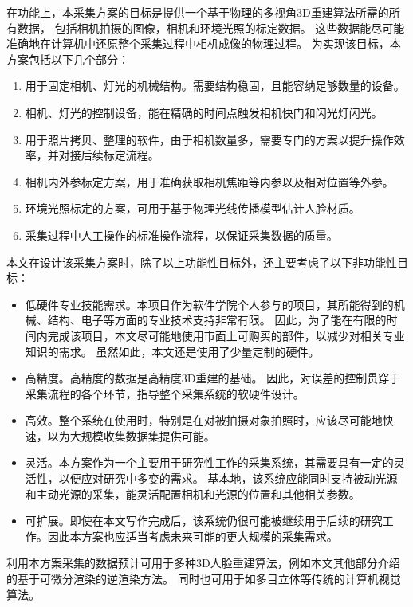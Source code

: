 在功能上，本采集方案的目标是提供一个基于物理的多视角3D重建算法所需的所有数据，
包括相机拍摄的图像，相机和环境光照的标定数据。
这些数据能尽可能准确地在计算机中还原整个采集过程中相机成像的物理过程。
为实现该目标，本方案包括以下几个部分：
\begin{enumerate}
\item 用于固定相机、灯光的机械结构。需要结构稳固，且能容纳足够数量的设备。
\item 相机、灯光的控制设备，能在精确的时间点触发相机快门和闪光灯闪光。
\item 用于照片拷贝、整理的软件，由于相机数量多，需要专门的方案以提升操作效率，并对接后续标定流程。
\item 相机内外参标定方案，用于准确获取相机焦距等内参以及相对位置等外参。
\item 环境光照标定的方案，可用于基于物理光线传播模型估计人脸材质。
\item 采集过程中人工操作的标准操作流程，以保证采集数据的质量。
\end{enumerate}
本文在设计该采集方案时，除了以上功能性目标外，还主要考虑了以下非功能性目标：
\begin{itemize}
\item 低硬件专业技能需求。本项目作为软件学院个人参与的项目，其所能得到的机械、结构、电子等方面的专业技术支持非常有限。
因此，为了能在有限的时间内完成该项目，本文尽可能地使用市面上可购买的部件，以减少对相关专业知识的需求。
虽然如此，本文还是使用了少量定制的硬件。

\item 高精度。高精度的数据是高精度3D重建的基础。
因此，对误差的控制贯穿于采集流程的各个环节，指导整个采集系统的软硬件设计。

\item 高效。整个系统在使用时，特别是在对被拍摄对象拍照时，应该尽可能地快速，以为大规模收集数据集提供可能。

\item 灵活。本方案作为一个主要用于研究性工作的采集系统，其需要具有一定的灵活性，以便应对研究中多变的需求。
基本地，该系统应能同时支持被动光源和主动光源的采集，能灵活配置相机和光源的位置和其他相关参数。

\item 可扩展。即使在本文写作完成后，该系统仍很可能被继续用于后续的研究工作。因此本方案也应适当考虑未来可能的更大规模的采集需求。

\end{itemize}

利用本方案采集的数据预计可用于多种3D人脸重建算法，例如本文其他部分介绍的基于可微分渲染的逆渲染方法。
同时也可用于如多目立体等传统的计算机视觉算法。


